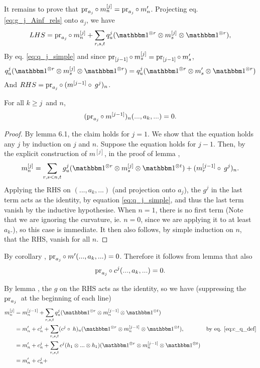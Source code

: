 It remains to prove that $\operatorname{pr}_{a_j} \circ\: m^{[j]}_n = \operatorname{pr}_{a_j} \circ\:
m'_n$. Projecting eq. \ref{eq:g_j_Ainf_rels} onto $a_{j}$, we have
\[  LHS = \pr_{a_j} \circ\: m^{[j]}_n + \sum_{r,s,t} q^j_u
(\I^{\otimes r} \otimes m^{[j]}_s \otimes \I^{\otimes r}), \]
By eq. \ref{eq:q_j_simple} and since 
$\operatorname{pr}_{[j-1]} \circ\: m^{[j]}_s = \operatorname{pr}_{[j-1]} \circ\: m'_s$, 
\[ q^j_u(\I^{\otimes r} \otimes m^{[j]}_s \otimes \I^{\otimes r})
 = q^j_u(\I^{\otimes r} \otimes m'_s \otimes \I^{\otimes r})
\]
And $RHS = \operatorname{pr}_{a_j} \circ\: (m^{[j-1]} \circ\: g^j)_n$. 

\begin{lemma}
\label{lemma:move_ii_beta}
For all $k \ge j$ and $n$, 
\[ (\operatorname{pr}_{a_j} \circ\: m^{[j-1]})_n(...,a_k,...) = 0. \]
\end{lemma}

\begin{proof}
By lemma 6.1, the claim holds for $j=1$. We show that the equation holds any
$j$ by induction on $j$ and $n$. Suppose the equation holds for $j-1$. Then,
by the explicit construction of $m^{[j]}$, in the proof of lemma
, 
\[  m^{[j]}_n = \sum_{r,s<n,t} g^j_u (\I^{\otimes r} \otimes m^{[j]}_s \otimes
\I^{\otimes t}) + ( m^{[j-1]}_r \circ\: g^j )_n. \]
Applying the RHS on $(..., a_k, ...)$ (and projection onto $a_j$), the $g^j$ in the last term acts
as the identity, by equation \ref{eq:q_j_simple}, and thus the last term vanish
by the inductive hypothesise. When $n=1$, there is no first term (Note that we are ignoring the curvature, ie. $n=0$, since we are
applying it to at least $a_k$.), so this case is immediate. It then also
follows, by simple induction on $n$, that the RHS, vanish for all $n$. 
\end{proof}

By corollary , $\operatorname{pr}_{a_j} \circ\: m'(...,a_k,...) = 0$. 
Therefore it follows from lemma  that also
\begin{equation}
\label{eq:c_on_a_k_vanish}
\operatorname{pr}_{a_j} \circ\: c^j(...,a_k,...) = 0. 
\end{equation}

By lemma , the $g$ on the RHS acts as the
identity, so we have (suppressing the $\operatorname{pr}_{a_j}$ at the beginning of each
line)
\begin{align*}
m^{[j]}_n 
&= m^{[j-1]}_n + \sum_{r,s,t} q^j_u (\I^{\otimes r} \otimes m^{[j-1]}_n\otimes
\I^{\otimes t}) \\
&= m'_n + c^j_n + \sum_{r,s,t} ( c^j \circ\: h )_u(\I^{\otimes r} \otimes m^{[j-1]}_n\otimes
\I^{\otimes t}), & \text{by eq. } \ref{eq:c_q_def} \\
&= m'_n + c^j_n + \sum_{r,s,t} c^j (h_1\otimes ... \otimes h_1)(\I^{\otimes r}
\otimes m^{[j-1]}_n\otimes \I^{\otimes t}) \\
&= m'_n + c^j_n + 
\end{align*}



